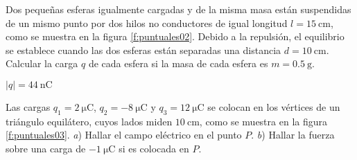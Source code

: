 %
\begin{minipage}[t]{.6\textwidth}
\begin{Exercise}\label{p:puntuales02}
  Dos pequeñas esferas igualmente cargadas y de la misma masa están suspendidas de un mismo punto por dos hilos no conductores de igual longitud $l = \SI{15}{\centi\metre}$, como se muestra en la figura \ref{f:puntuales02}. Debido a la repulsión, el equilibrio se establece cuando las dos esferas están separadas una distancia $d = \SI{10}{\centi\metre}$. Calcular la carga $q$ de cada esfera si la masa de cada esfera es $m = \SI{0.5}{\gram}$.
\end{Exercise}
\begin{Answer}
  $|q| = \SI{44}{\nano\coulomb}$
\end{Answer}
\end{minipage}
%
\begin{minipage}[t]{.4\textwidth}
\strut\vspace*{-\baselineskip}
\begin{center}
\end{center}
\end{minipage}
%
\begin{Exercise}\label{p:puntuales03}
Las cargas $q_1 = \SI{2}{\micro\coulomb}$, $q_2 = \SI{-8}{\micro\coulomb}$ y $q_3 = \SI{12}{\micro\coulomb}$ se colocan en los vértices de un triángulo equilátero, cuyos lados miden $\SI{10}{\centi\metre}$, como se muestra en la figura \ref{f:puntuales03}. \textit{a}) Hallar el campo eléctrico en el punto $P$. \textit{b}) Hallar la fuerza sobre una carga de $\SI{-1}{\micro\coulomb}$ si es colocada en $P$.
\end{Exercise}
